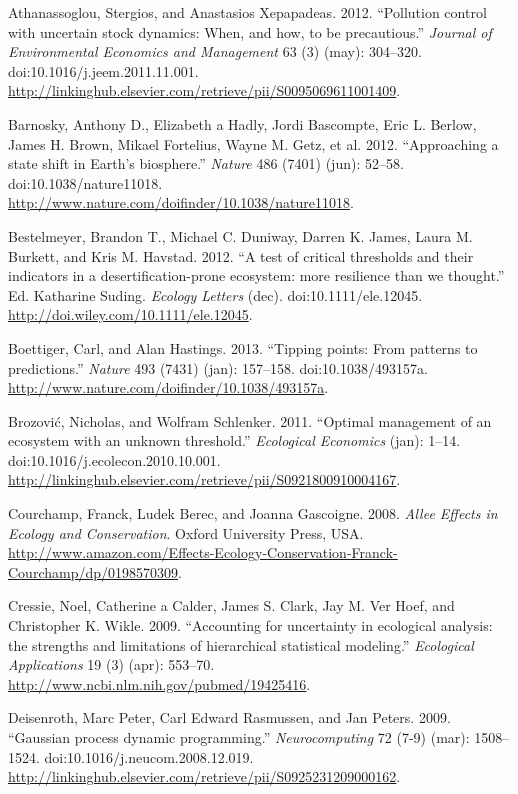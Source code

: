 \documentclass[author-year, review]{elsarticle} %
\begin{document}
Athanassoglou, Stergios, and Anastasios Xepapadeas. 2012. ``Pollution
control with uncertain stock dynamics: When, and how, to be
precautious.'' \emph{Journal of Environmental Economics and Management}
63 (3) (may): 304--320. doi:10.1016/j.jeem.2011.11.001.
\url{http://linkinghub.elsevier.com/retrieve/pii/S0095069611001409}.

Barnosky, Anthony D., Elizabeth a Hadly, Jordi Bascompte, Eric L.
Berlow, James H. Brown, Mikael Fortelius, Wayne M. Getz, et al. 2012.
``Approaching a state shift in Earth's biosphere.'' \emph{Nature} 486
(7401) (jun): 52--58. doi:10.1038/nature11018.
\url{http://www.nature.com/doifinder/10.1038/nature11018}.

Bestelmeyer, Brandon T., Michael C. Duniway, Darren K. James, Laura M.
Burkett, and Kris M. Havstad. 2012. ``A test of critical thresholds and
their indicators in a desertification-prone ecosystem: more resilience
than we thought.'' Ed. Katharine Suding. \emph{Ecology Letters} (dec).
doi:10.1111/ele.12045. \url{http://doi.wiley.com/10.1111/ele.12045}.

Boettiger, Carl, and Alan Hastings. 2013. ``Tipping points: From
patterns to predictions.'' \emph{Nature} 493 (7431) (jan): 157--158.
doi:10.1038/493157a.
\url{http://www.nature.com/doifinder/10.1038/493157a}.

Brozović, Nicholas, and Wolfram Schlenker. 2011. ``Optimal management of
an ecosystem with an unknown threshold.'' \emph{Ecological Economics}
(jan): 1--14. doi:10.1016/j.ecolecon.2010.10.001.
\url{http://linkinghub.elsevier.com/retrieve/pii/S0921800910004167}.

Courchamp, Franck, Ludek Berec, and Joanna Gascoigne. 2008. \emph{Allee
Effects in Ecology and Conservation}. Oxford University Press, USA.
\url{http://www.amazon.com/Effects-Ecology-Conservation-Franck-Courchamp/dp/0198570309}.

Cressie, Noel, Catherine a Calder, James S. Clark, Jay M. Ver Hoef, and
Christopher K. Wikle. 2009. ``Accounting for uncertainty in ecological
analysis: the strengths and limitations of hierarchical statistical
modeling.'' \emph{Ecological Applications} 19 (3) (apr): 553--70.
\url{http://www.ncbi.nlm.nih.gov/pubmed/19425416}.

Deisenroth, Marc Peter, Carl Edward Rasmussen, and Jan Peters. 2009.
``Gaussian process dynamic programming.'' \emph{Neurocomputing} 72 (7-9)
(mar): 1508--1524. doi:10.1016/j.neucom.2008.12.019.
\url{http://linkinghub.elsevier.com/retrieve/pii/S0925231209000162}.
\end{document}
